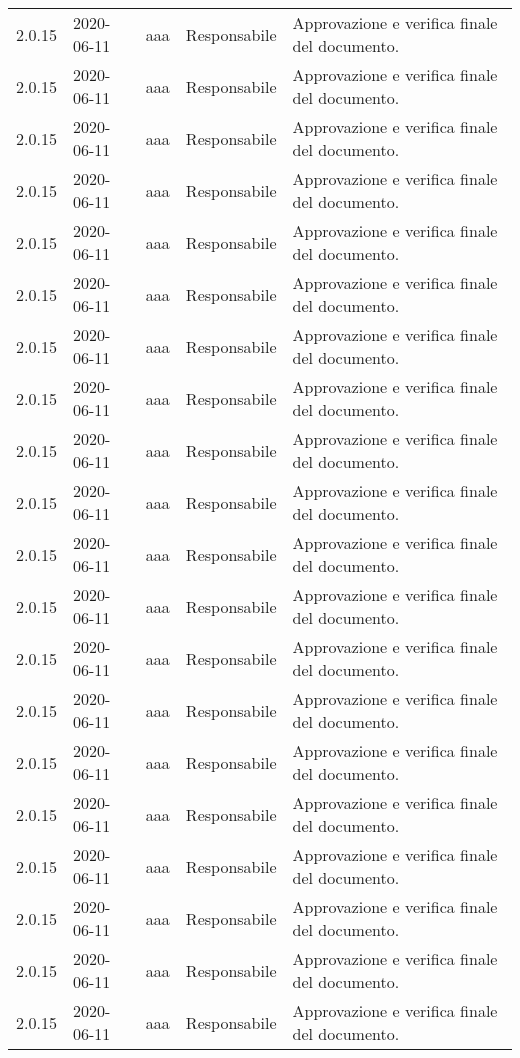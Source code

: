 {\begin{longtable}{c C{2.5cm} C{3.5cm} C{2.5cm} C{3.5cm}}
2.0.15 & 2020-06-11 & aaa & Responsabile & Approvazione e verifica finale del documento. \\
2.0.15 & 2020-06-11 & aaa & Responsabile & Approvazione e verifica finale del documento. \\
2.0.15 & 2020-06-11 & aaa & Responsabile & Approvazione e verifica finale del documento. \\
2.0.15 & 2020-06-11 & aaa & Responsabile & Approvazione e verifica finale del documento. \\
2.0.15 & 2020-06-11 & aaa & Responsabile & Approvazione e verifica finale del documento. \\
2.0.15 & 2020-06-11 & aaa & Responsabile & Approvazione e verifica finale del documento. \\
2.0.15 & 2020-06-11 & aaa & Responsabile & Approvazione e verifica finale del documento. \\
2.0.15 & 2020-06-11 & aaa & Responsabile & Approvazione e verifica finale del documento. \\
2.0.15 & 2020-06-11 & aaa & Responsabile & Approvazione e verifica finale del documento. \\
2.0.15 & 2020-06-11 & aaa & Responsabile & Approvazione e verifica finale del documento. \\
2.0.15 & 2020-06-11 & aaa & Responsabile & Approvazione e verifica finale del documento. \\
2.0.15 & 2020-06-11 & aaa & Responsabile & Approvazione e verifica finale del documento. \\
2.0.15 & 2020-06-11 & aaa & Responsabile & Approvazione e verifica finale del documento. \\
2.0.15 & 2020-06-11 & aaa & Responsabile & Approvazione e verifica finale del documento. \\
2.0.15 & 2020-06-11 & aaa & Responsabile & Approvazione e verifica finale del documento. \\
2.0.15 & 2020-06-11 & aaa & Responsabile & Approvazione e verifica finale del documento. \\
2.0.15 & 2020-06-11 & aaa & Responsabile & Approvazione e verifica finale del documento. \\
2.0.15 & 2020-06-11 & aaa & Responsabile & Approvazione e verifica finale del documento. \\
2.0.15 & 2020-06-11 & aaa & Responsabile & Approvazione e verifica finale del documento. \\
2.0.15 & 2020-06-11 & aaa & Responsabile & Approvazione e verifica finale del documento. \\

\end{longtable}}
